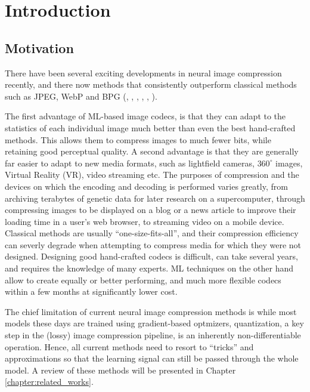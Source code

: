 \chapter{Introduction}

\section{Motivation}
\par
There have been several exciting developments in neural image compression
recently, and there now methods that consistently outperform classical methods
such as JPEG, WebP and BPG (\cite{toderici2017full}, \cite{theis2017lossy},
\cite{rippel2017real}, \cite{balle2018variational}, \cite{johnston2018cvpr},
\cite{mentzer2018cvpr}).

\par
The first advantage of ML-based image codecs, is that they can adapt to the
statistics of each individual image much better than even the best hand-crafted
methods. This allows them to compress images to much fewer bits, while retaining good
perceptual quality. A second advantage is that they are generally far easier to
adapt to new media formats, such as lightfield cameras, $360^\circ$ images,
Virtual Reality (VR), video streaming etc. The purposes of compression and the
devices on which the encoding and decoding is performed varies greatly, from
archiving terabytes of genetic data for later research on a supercomputer,
through compressing images to be displayed on a blog or a news article to
improve their loading time in a user's web browser, to
streaming video on a mobile device. Classical methods are usually
``one-size-fits-all'', and their compression efficiency can severly degrade when
attempting to compress media for which they were not designed. Designing good
hand-crafted codecs is difficult, can take several years, and
requires the knowledge of many experts. ML techniques on the other hand allow to
create equally or better performing, and much more flexible codecs within a few
months at significantly lower cost.

\par
The chief limitation of current neural image compression methods is while most
models these days are trained using gradient-based optmizers, quantization, a
key step in the (lossy) image compression pipeline, is an inherently
non-differentiable operation. Hence, all current methods need to resort to
``tricks'' and approximations so that the learning signal can still be passed
through the whole model. A review of these methods will be presented in Chapter 
\ref{chapter:related_works}.

